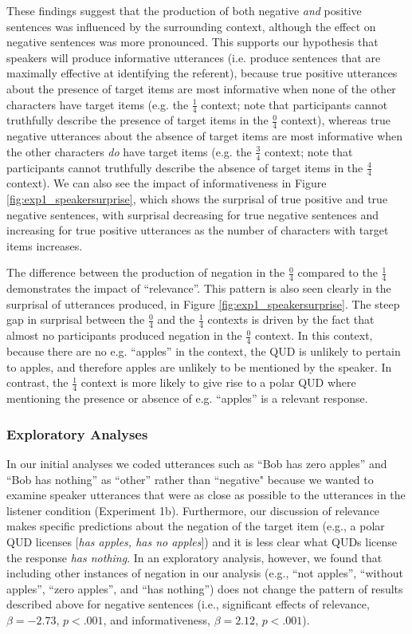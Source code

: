 \documentclass[man, floatsintext, noapacite]{apa6}
\begin{document}
These findings suggest that the production of both negative \textit{and} positive sentences was influenced by the surrounding context, although the effect on negative sentences was more pronounced. This supports our hypothesis that speakers will produce informative utterances (i.e. produce sentences that are maximally effective at identifying the referent), because true positive utterances about the presence of target items are most informative when none of the other characters have target items (e.g. the $\frac{1}{4}$ context; note that participants cannot truthfully describe the presence of target items in the $\frac{0}{4}$ context), whereas true negative utterances about the absence of target items are most informative when the other characters \textit{do} have target items (e.g. the $\frac{3}{4}$ context; note that participants cannot truthfully describe the absence of target items in the $\frac{4}{4}$ context). We can also see the impact of informativeness in Figure \ref{fig:exp1_speakersurprise}, which shows the surprisal of true positive and true negative sentences, with surprisal decreasing for true negative sentences and increasing for true positive utterances as the number of characters with target items increases. 

The difference between the production of negation in the $\frac{0}{4}$ compared to the  $\frac{1}{4}$ demonstrates the impact of ``relevance''. This pattern is also seen clearly in the surprisal of utterances produced, in Figure \ref{fig:exp1_speakersurprise}. The steep gap in surprisal between the  $\frac{0}{4}$ and the  $\frac{1}{4}$ contexts is driven by the fact that almost no participants produced negation in the  $\frac{0}{4}$ context. In this context, because there are no e.g. ``apples'' in the context, the QUD is unlikely to pertain to apples, and therefore apples are unlikely to be mentioned by the speaker. In contrast, the $\frac{1}{4}$ context is more likely to give rise to a polar QUD where mentioning the presence or absence of e.g. ``apples'' is a relevant response. 

\subsubsection{Exploratory Analyses}

In our initial analyses we coded utterances such as ``Bob has zero apples'' and ``Bob has nothing'' as ``other'' rather than ``negative" because we wanted to examine speaker utterances that were as close as possible to the utterances in the listener condition (Experiment 1b). Furthermore, our discussion of relevance makes specific predictions about the negation of the target item (e.g., a polar QUD licenses [\textit{has apples, has no apples}]) and it is less clear what QUDs license the response \textit{has nothing}. In an exploratory analysis, however, we found that including other instances of negation in our analysis (e.g., ``not apples'', ``without apples'', ``zero apples'', and ``has nothing'') does not change the pattern of results described above for negative sentences (i.e., significant effects of relevance, $\beta= -2.73$, $p< .001$, and informativeness, $\beta= 2.12$, $p< .001$). 
\end{document}
